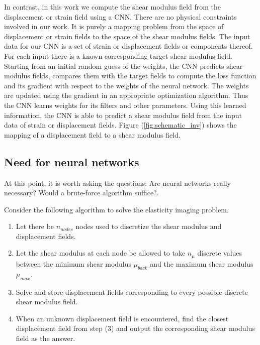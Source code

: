 \documentclass[12pt]{article}
\begin{document}
In contrast, in this work we compute the shear modulus field from the displacement or strain field using a CNN. There are no physical constraints involved in our work. It is purely a mapping problem from the space of displacement or strain fields to the space of the shear modulus fields. The input data for our CNN is a set of strain or displacement fields or components thereof. For each input there is a known corresponding target shear modulus field. Starting from an initial random guess of the weights, the CNN predicts shear modulus fields, compares them with the target fields to compute the loss function and its gradient with respect to the weights of the neural network. The weights are updated using the gradient in an appropriate optimization algorithm. Thus the CNN learns weights for its filters and other parameters. Using this learned information, the CNN is able to predict a shear modulus field from the input data of strain or displacement fields. Figure (\ref{fig:schematic_inv}) shows the mapping of a displacement field to a shear modulus field.\\
\subsection{Need for neural networks}
At this point, it is worth asking the questions: Are neural networks really necessary? Would a brute-force algorithm suffice?.

Consider the following algorithm to solve the elasticity imaging problem.
%
\begin{enumerate}
\item{Let there be $n_{nodes}$ nodes used to discretize the shear modulus and displacement fields.}
\item{Let the shear modulus at each node be allowed to take $n_{\mu}$ discrete values between the minimum shear modulus $\mu_{back}$ and the maximum shear modulus $\mu_{max}$.}
\item{Solve and store displacement fields corresponding to every possible discrete shear modulus field.}
\item{When an unknown displacement field is encountered, find the closest displacement field from step (3) and output the corresponding shear modulus field as the answer.}
\end{enumerate}
\end{document}
